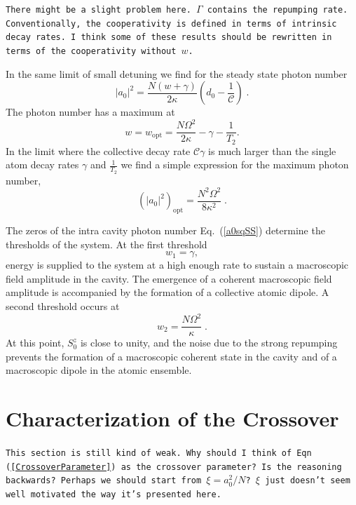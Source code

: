 \documentclass[aps,
twocolumn,
superscriptaddress,groupedaddress]{revtex4}
\newcommand{\dmcomment}[1]{{\tt #1}}
\begin{document}
\dmcomment{There might be a slight problem here.  $\Gamma$ contains the
repumping rate.  Conventionally, the cooperativity is defined in terms
of intrinsic decay rates.  I think some of these results should be
rewritten in terms of the cooperativity without $w$.}

In the same limit of small detuning we find for the steady state photon
number
\begin{equation}
|a_0|^2=\frac{N(w+\gamma)}{2 \kappa} (d_0 - \frac{1}{\mathcal{C}})\;.
\label{a0sqSS}
\end{equation}
The photon number has a maximum at
\begin{equation}
w=w_{\mathrm{opt}} = \frac{N \Omega^2}{2\kappa} - \gamma - \frac{1}{T_2}.
\label{wopt}
\end{equation}
In the limit where the collective decay rate $\mathcal{C}\gamma$ is much
larger than the single atom decay rates $\gamma$ and $\frac{1}{T_2}$ we
find a simple expression for the maximum photon number,
\begin{equation}
(|a_0|^2)_{\mathrm{opt}}= \frac{N^2 \Omega^2}{8\kappa^2}\;.
\label{adaopt}
\end{equation}

The zeros of the intra cavity photon number Eq.~(\ref{a0sqSS}) determine
the thresholds of the system.  At the first threshold
\begin{equation}
w_1 = \gamma,
\label{FirstThreshold}
\end{equation} 
energy is supplied to the system at a high enough rate to sustain a
macroscopic field amplitude in the cavity.  The emergence of a coherent
macroscopic field amplitude is accompanied by the formation of a
collective atomic dipole.  A second threshold occurs at
\begin{equation}
w_2 =  \frac{N \Omega^2}{\kappa}\;.
\end{equation} 
At this point, $S_0^{z}$ is close to unity, and the noise due to the
strong repumping prevents the formation of a macroscopic coherent state
in the cavity and of a macroscopic dipole in the atomic ensemble.


\section{Characterization of the Crossover}
\label{sec:CrossoverCharacterization}

\dmcomment{This section is still kind of weak.  Why should I think of
Eqn (\ref{CrossoverParameter}) as the crossover parameter?  Is the
reasoning backwards?  Perhaps we should start from $\xi=a_0^2/N$?  $\xi$
just doesn't seem well motivated the way it's presented here.}
\end{document}
